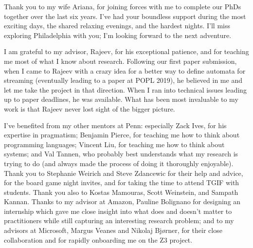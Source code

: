 Thank you to my wife Ariana, for joining forces with me to complete our PhDs together over the last six years.
I've had your boundless support during the most exciting days, the shared relaxing evenings, and the hardest nights.
I'll miss exploring Philadelphia with you; I'm looking forward to the next adventure.

I am grateful to my advisor, Rajeev, for his exceptional patience, and for teaching me most of what I know about research.
Following our first paper submission, when I came to Rajeev with a crazy idea for a better way to define automata for streaming (eventually leading to a paper at POPL 2019), he believed in me and let me take the project in that direction.
When I ran into technical issues leading up to paper deadlines, he was available.
What has been most invaluable to my work is that
Rajeev never lost sight of the bigger picture.

I've benefited from my other mentors at Penn: especially Zack Ives, for his expertise in pragmatism; Benjamin Pierce, for teaching me how to think about programming languages; Vincent Liu, for teaching me how to think about systems; and Val Tannen, who probably best understands what my research is trying to do (and always made the process of doing it thoroughly enjoyable).
Thank you to Stephanie Weirich and Steve Zdancewic for their help and advice, for the board game night invites, and for taking the time to attend TGIF with students.
Thank you also to Kostas Mamouras, Scott Weinstein, and Sampath Kannan.
Thanks to my advisor at Amazon, Pauline Bolignano for designing an internship which gave me close insight into what does and doesn't matter to practitioners while still capturing an interesting research problem; and to my advisors at Microsoft, Margus Veanes and Nikolaj Bjørner,
for their close collaboration and for rapidly onboarding me on the Z3 project.

